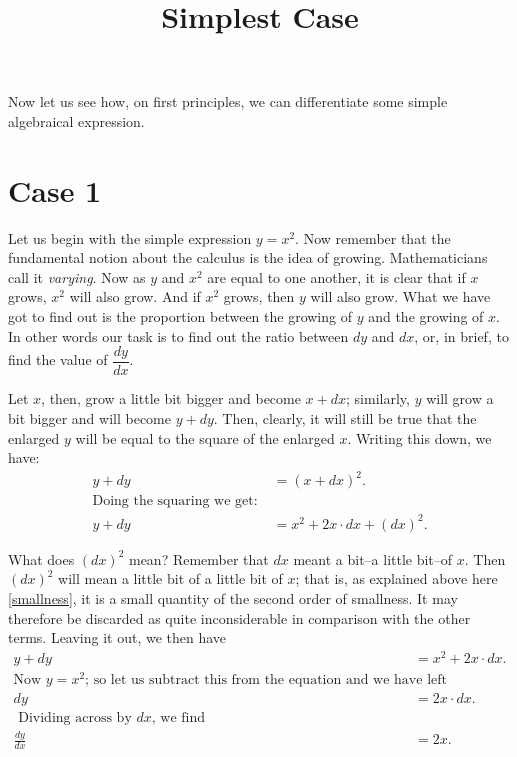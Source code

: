 \documentclass{ximera}
\title{Simplest Case}
\begin{document}
\begin{abstract}
\end{abstract}
\maketitle

Now let us see how, on first principles, we can differentiate some simple algebraical expression.

\section*{Case 1}
Let us begin with the simple expression $y=x^2$. Now remember that the fundamental notion about the calculus is the idea of growing. Mathematicians call it \emph{varying}. Now as $y$ and $x^2$ are equal to one another, it is clear that if $x$ grows, $x^2$ will also grow. And if $x^2$ grows, then $y$ will also grow. What we have got to find out is the proportion between the growing of $y$ and the growing of $x$. In other words our task is to find out the ratio between $dy$ and $dx$, or, in brief, to find the value of $\dfrac{dy}{dx}$.

Let $x$, then, grow a little bit bigger and become $x + dx$; similarly, $y$ will grow a bit bigger and will become $y + dy$. Then, clearly, it will still be true that the enlarged $y$ will be equal to the square of the enlarged $x$. Writing this down, we have:
\begin{align*}
y + dy &= (x + dx)^2.\\
\text{Doing the squaring we get:}\;\\
y + dy &= x^2 + 2x · dx+(dx)^2.
\end{align*}

What does $(dx)^2$ mean? Remember that $dx$ meant a bit–a little bit–of $x$. Then $(dx)^2$ will mean a little bit of a little bit of $x$; that is, as explained above here \ref{smallness}, it is a small quantity of the second order of smallness. It may therefore be discarded as quite inconsiderable in comparison with the other terms. Leaving it out, we then have
\begin{align*} \label{diffexample}
y + dy &= x^2 + 2x \cdot dx.  \\
\text{Now $y=x^2$; so let us subtract this from the equation
and we have left}\;\\
dy &= 2x · dx.  \\
\text{  Dividing across by $dx$, we find}\;\\
\frac{dy}{dx} &= 2x.
\end{align*}
\end{document}

